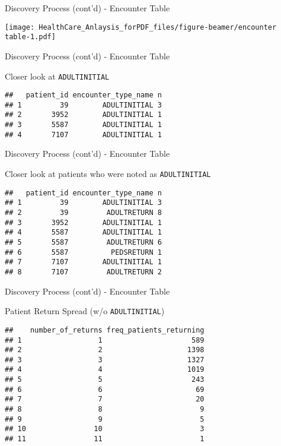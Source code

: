 \documentclass[ignorenonframetext,]{beamer}
\begin{document}
\begin{frame}{Discovery Process (cont'd) - Encounter Table}

\texttt{[image: HealthCare\_Anlaysis\_forPDF\_files/figure-beamer/encounter table-1.pdf]}

\end{frame}

\begin{frame}[fragile]{Discovery Process (cont'd) - Encounter Table}

Closer look at \texttt{ADULTINITIAL}

\begin{verbatim}
##   patient_id encounter_type_name n
## 1         39        ADULTINITIAL 3
## 2       3952        ADULTINITIAL 1
## 3       5587        ADULTINITIAL 1
## 4       7107        ADULTINITIAL 1
\end{verbatim}

\end{frame}

\begin{frame}[fragile]{Discovery Process (cont'd) - Encounter Table}

Closer look at patients who were noted as \texttt{ADULTINITIAL}

\begin{verbatim}
##   patient_id encounter_type_name n
## 1         39        ADULTINITIAL 3
## 2         39         ADULTRETURN 8
## 3       3952        ADULTINITIAL 1
## 4       5587        ADULTINITIAL 1
## 5       5587         ADULTRETURN 6
## 6       5587          PEDSRETURN 1
## 7       7107        ADULTINITIAL 1
## 8       7107         ADULTRETURN 2
\end{verbatim}

\end{frame}

\begin{frame}[fragile]{Discovery Process (cont'd) - Encounter Table}

Patient Return Spread (w/o \texttt{ADULTINITIAL})

\begin{verbatim}
##    number_of_returns freq_patients_returning
## 1                  1                     589
## 2                  2                    1398
## 3                  3                    1327
## 4                  4                    1019
## 5                  5                     243
## 6                  6                      69
## 7                  7                      20
## 8                  8                       9
## 9                  9                       5
## 10                10                       3
## 11                11                       1
\end{verbatim}

\end{frame}
\end{document}
